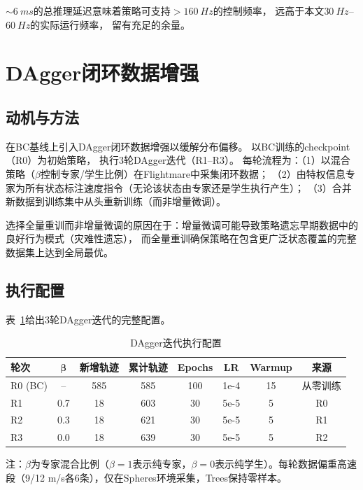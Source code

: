 $\sim\SI{6}{ms}$的总推理延迟意味着策略可支持$>\SI{160}{Hz}$的控制频率，
远高于本文$\SI{30}{Hz}$--$\SI{60}{Hz}$的实际运行频率，
留有充足的余量。


\section{DAgger闭环数据增强}

\subsection{动机与方法}

在BC基线上引入DAgger\cite{Ross2011DAgger}闭环数据增强以缓解分布偏移。
以BC训练的checkpoint（R0）为初始策略，
执行3轮DAgger迭代（R1--R3）。
每轮流程为：（1）以混合策略（$\beta$控制专家/学生比例）在Flightmare中采集闭环数据；
（2）由特权信息专家为所有状态标注速度指令（无论该状态由专家还是学生执行产生）；
（3）合并新数据到训练集中从头重新训练（而非增量微调）。

选择全量重训而非增量微调的原因在于：增量微调可能导致策略遗忘早期数据中的良好行为模式（灾难性遗忘），
而全量重训确保策略在包含更广泛状态覆盖的完整数据集上达到全局最优。

\subsection{执行配置}

表~\ref{tab:dagger_config_ch3}给出3轮DAgger迭代的完整配置。

\begin{table}[htbp]
\centering
\caption{DAgger迭代执行配置}
\label{tab:dagger_config_ch3}
\begin{tabular}{lccccccc}
\toprule
\textbf{轮次} & $\boldsymbol{\beta}$ & \textbf{新增轨迹} & \textbf{累计轨迹} & \textbf{Epochs} & \textbf{LR} & \textbf{Warmup} & \textbf{来源} \\
\midrule
R0 (BC) & -- & 585 & 585 & 100 & 1e-4 & 15 & 从零训练 \\
R1 & 0.7 & 18 & 603 & 30 & 5e-5 & 5 & R0 \\
R2 & 0.3 & 18 & 621 & 30 & 5e-5 & 5 & R1 \\
R3 & 0.0 & 18 & 639 & 30 & 5e-5 & 5 & R2 \\
\bottomrule
\end{tabular}
\begin{tablenotes}
\item {} 注：$\beta$为专家混合比例（$\beta=1$表示纯专家，$\beta=0$表示纯学生）。每轮数据偏重高速段（9/12 m/s各6条），仅在Spheres环境采集，Trees保持零样本。
\end{tablenotes}
\end{table}

